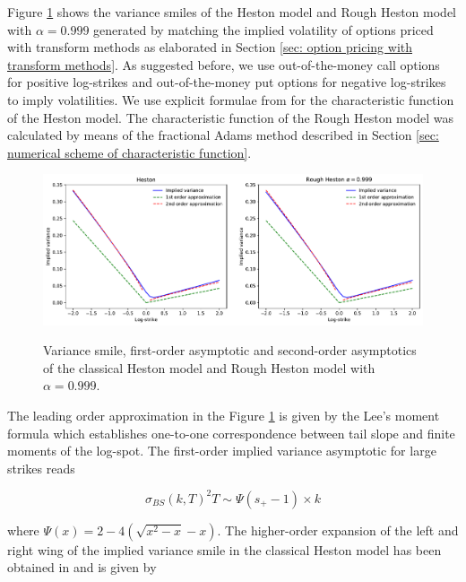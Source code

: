 \documentclass[12pt,twoside]{article}
\theoremstyle{plain}
\theoremstyle{plain}
\theoremstyle{definition}
\theoremstyle{remark}
\numberwithin{equation}{section}
\begin{document}
Figure \ref{fig: asymptotic rough heston reconciliation} shows the variance smiles of the Heston model and Rough Heston model with $\alpha=0.999$ generated by matching the implied volatility of options priced with transform methods as elaborated in Section \ref{sec: option pricing with transform methods}. As suggested before, we use out-of-the-money call options for positive log-strikes and out-of-the-money put options for negative log-strikes to imply volatilities. We use explicit formulae from \cite{H93} for the characteristic function of the Heston model. The characteristic function of the Rough Heston model was calculated by means of the fractional Adams method described in Section \ref{sec: numerical scheme of characteristic function}.

\begin{figure}[H]
\centering
\includegraphics[width=1\textwidth]{figures/reconciliation.pdf} \\
\caption{Variance smile, first-order asymptotic and second-order asymptotics of the classical Heston model and Rough Heston model with $\alpha=0.999$.}
\label{fig: asymptotic rough heston reconciliation}
\end{figure}

The leading order approximation in the Figure \ref{fig: asymptotic rough heston reconciliation} is given by the Lee's moment formula \cite{L03} which establishes one-to-one correspondence between tail slope and finite moments of the log-spot. The first-order implied variance asymptotic for large strikes reads

$$
\sigma_{B S}(k, T)^{2} T \sim \Psi\left(s_{+}-1\right) \times k
$$

\vspace{10pt}

where $\Psi(x) = 2 - 4 (\sqrt{x^2-x} - x)$. The higher-order expansion of the left and right wing of the implied variance smile in the classical Heston model has been obtained in \cite{FGGS10} and is given by
\end{document}
